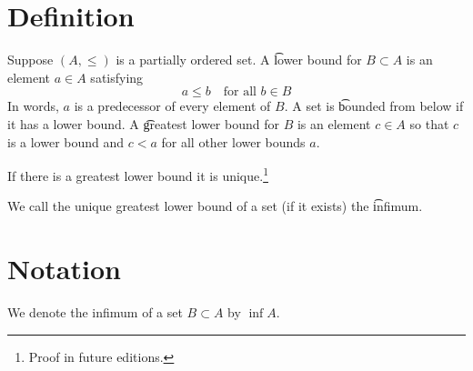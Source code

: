 

\section*{Definition}

Suppose $(A, \leq)$ is a partially ordered set.
A \t{lower bound} for $B \subset A$ is an element $a \in A$ satisfying
\[
a \leq b \quad \text{for all } b \in B
\]
In words, $a$ is a predecessor of every element of $B$.
A set is \t{bounded from below} if it has a lower bound.
A \t{greatest lower bound} for $B$ is an element $c \in A$ so that $c$ is a lower bound and $c < a$ for all other lower bounds $a$.

\begin{proposition}
If there is a greatest lower bound it is unique.\footnote{Proof in future editions.}
\end{proposition}

We call the unique greatest lower bound of a set (if it exists) the \t{infimum}.

\section*{Notation}

We denote the infimum of a set $B \subset A$ by $\inf A$.

\blankpage